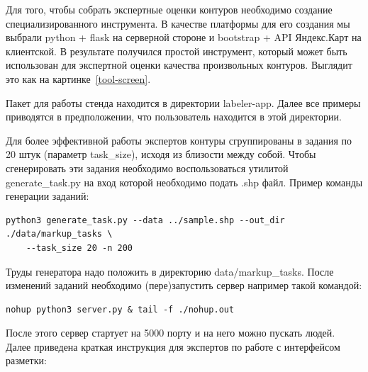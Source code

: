 \documentclass[12pt]{article}
\begin{document}
Для того, чтобы собрать экспертные оценки контуров необходимо создание специализированного инструмента. В качестве платформы для его создания мы выбрали python + flask на серверной стороне и bootstrap + API Яндекс.Карт на клиентской. В результате получился простой инструмент, который может быть использован для экспертной оценки качества произвольных контуров. Выглядит это как на картинке~\ref{tool-screen}.

Пакет для работы стенда находится в директории labeler-app. Далее все примеры приводятся в предположении, что пользователь находится в этой директории.

Для более эффективной работы экспертов контуры сгруппированы в задания по 20 штук (параметр \-\-task\_size), исходя из близости между собой. Чтобы сгенерировать эти задания необходимо воспользоваться утилитой generate\_task.py на вход которой необходимо подать .shp файл. Пример команды генерации заданий:
{\footnotesize
\begin{verbatim}
python3 generate_task.py --data ../sample.shp --out_dir ./data/markup_tasks \
	--task_size 20 -n 200
\end{verbatim}
}
Труды генератора надо положить в директорию data/markup\_tasks. После изменений заданий необходимо (пере)запустить сервер например такой командой:
{\footnotesize
\begin{verbatim}
nohup python3 server.py & tail -f ./nohup.out
\end{verbatim}
}
После этого сервер стартует на 5000 порту и на него можно пускать людей. Далее приведена краткая инструкция для экспертов по работе с интерфейсом разметки:
\end{document}
